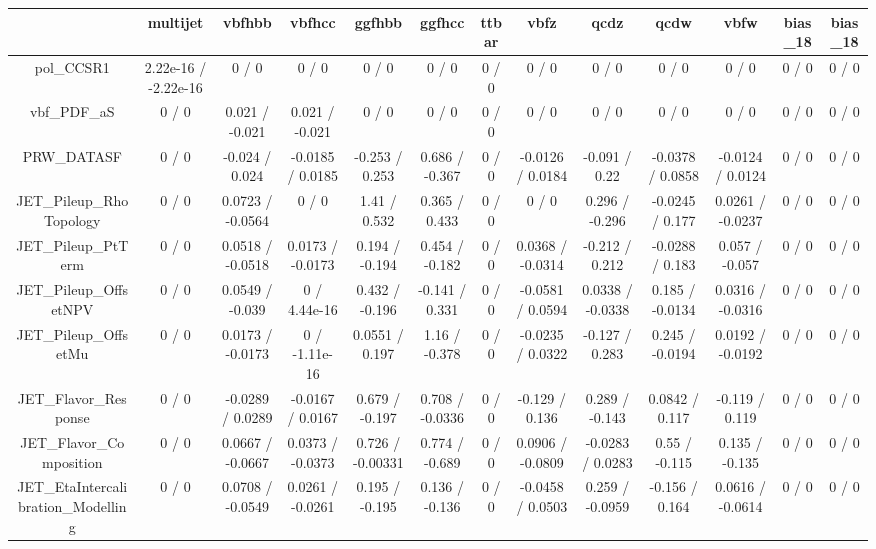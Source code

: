 \documentclass[10pt]{article}
\begin{document}
\begin{table}[htbp]
\begin{center}
\begin{tabular}{|c|c|c|c|c|c|c|c|c|c|c|c|c|}
\hline 
      & multijet      & vbfhbb      & vbfhcc      & ggfhbb      & ggfhcc      & ttbar      & vbfz      & qcdz      & qcdw      & vbfw      & bias_18      & bias_18 \\ 
\hline 
  pol_CCSR1 & 2.22e-16 / -2.22e-16 & 0 / 0 & 0 / 0 & 0 / 0 & 0 / 0 & 0 / 0 & 0 / 0 & 0 / 0 & 0 / 0 & 0 / 0 & 0 / 0 & 0 / 0 \\ 
  vbf_PDF_aS & 0 / 0 & 0.021 / -0.021 & 0.021 / -0.021 & 0 / 0 & 0 / 0 & 0 / 0 & 0 / 0 & 0 / 0 & 0 / 0 & 0 / 0 & 0 / 0 & 0 / 0 \\ 
  PRW_DATASF & 0 / 0 & -0.024 / 0.024 & -0.0185 / 0.0185 & -0.253 / 0.253 & 0.686 / -0.367 & 0 / 0 & -0.0126 / 0.0184 & -0.091 / 0.22 & -0.0378 / 0.0858 & -0.0124 / 0.0124 & 0 / 0 & 0 / 0 \\ 
  JET_Pileup_RhoTopology & 0 / 0 & 0.0723 / -0.0564 & 0 / 0 & 1.41 / 0.532 & 0.365 / 0.433 & 0 / 0 & 0 / 0 & 0.296 / -0.296 & -0.0245 / 0.177 & 0.0261 / -0.0237 & 0 / 0 & 0 / 0 \\ 
  JET_Pileup_PtTerm & 0 / 0 & 0.0518 / -0.0518 & 0.0173 / -0.0173 & 0.194 / -0.194 & 0.454 / -0.182 & 0 / 0 & 0.0368 / -0.0314 & -0.212 / 0.212 & -0.0288 / 0.183 & 0.057 / -0.057 & 0 / 0 & 0 / 0 \\ 
  JET_Pileup_OffsetNPV & 0 / 0 & 0.0549 / -0.039 & 0 / 4.44e-16 & 0.432 / -0.196 & -0.141 / 0.331 & 0 / 0 & -0.0581 / 0.0594 & 0.0338 / -0.0338 & 0.185 / -0.0134 & 0.0316 / -0.0316 & 0 / 0 & 0 / 0 \\ 
  JET_Pileup_OffsetMu & 0 / 0 & 0.0173 / -0.0173 & 0 / -1.11e-16 & 0.0551 / 0.197 & 1.16 / -0.378 & 0 / 0 & -0.0235 / 0.0322 & -0.127 / 0.283 & 0.245 / -0.0194 & 0.0192 / -0.0192 & 0 / 0 & 0 / 0 \\ 
  JET_Flavor_Response & 0 / 0 & -0.0289 / 0.0289 & -0.0167 / 0.0167 & 0.679 / -0.197 & 0.708 / -0.0336 & 0 / 0 & -0.129 / 0.136 & 0.289 / -0.143 & 0.0842 / 0.117 & -0.119 / 0.119 & 0 / 0 & 0 / 0 \\ 
  JET_Flavor_Composition & 0 / 0 & 0.0667 / -0.0667 & 0.0373 / -0.0373 & 0.726 / -0.00331 & 0.774 / -0.689 & 0 / 0 & 0.0906 / -0.0809 & -0.0283 / 0.0283 & 0.55 / -0.115 & 0.135 / -0.135 & 0 / 0 & 0 / 0 \\ 
  JET_EtaIntercalibration_Modelling & 0 / 0 & 0.0708 / -0.0549 & 0.0261 / -0.0261 & 0.195 / -0.195 & 0.136 / -0.136 & 0 / 0 & -0.0458 / 0.0503 & 0.259 / -0.0959 & -0.156 / 0.164 & 0.0616 / -0.0614 & 0 / 0 & 0 / 0 \\ 

\end{tabular}
\end{center}
\end{table}
\end{document}
